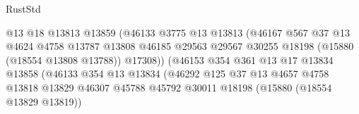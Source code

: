 \begin{lexlean}{RustStd}
\begin{coremodule}
                                            @13
                                            @18
                                            @13813
                                            @13859
                                            (@46133
                                              @3775
                                              @13
                                              @13813
                                              (@46167
                                                @567
                                                @37
                                                @13
                                                @4624
                                                @4758
                                                @13787
                                                @13808
                                                @46185
                                                @29563
                                                @29567
                                                @30255
                                                @18198
                                                (@15880 (@18554 @13808 @13788))
                                                @17308))
                                            (@46153
                                              @354
                                              @361
                                              @13
                                              @17
                                              @13834
                                              @13858
                                              (@46133
                                                @354
                                                @13
                                                @13834
                                                (@46292
                                                  @125
                                                  @37
                                                  @13
                                                  @4657
                                                  @4758
                                                  @13818
                                                  @13829
                                                  @46307
                                                  @45788
                                                  @45792
                                                  @30011
                                                  @18198
                                                  (@15880 (@18554 @13829 @13819))

\end{coremodule}
\end{lexlean}
